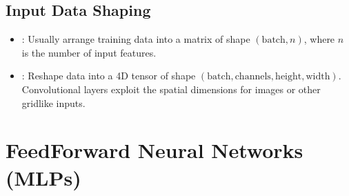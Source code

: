 \documentclass[letterpaper,10pt,english]{jupyterBook}
\begin{document}
\subsection{Input Data Shaping}
\label{\detokenize{04:input-data-shaping}}\begin{itemize}
\item {} 
\sphinxAtStartPar
{}: Usually arrange training data into a matrix of shape \((\text{batch}, n)\), where \(n\) is the number of input features.

\item {} 
\sphinxAtStartPar
{}: Reshape data into a 4D tensor of shape \((\text{batch}, \text{channels}, \text{height}, \text{width})\). Convolutional layers exploit the spatial dimensions for images or other grid\sphinxhyphen{}like inputs.

\end{itemize}


\section{Feed\sphinxhyphen{}Forward Neural Networks (MLPs)}
\label{\detokenize{04:feed-forward-neural-networks-mlps}}
\end{document}
